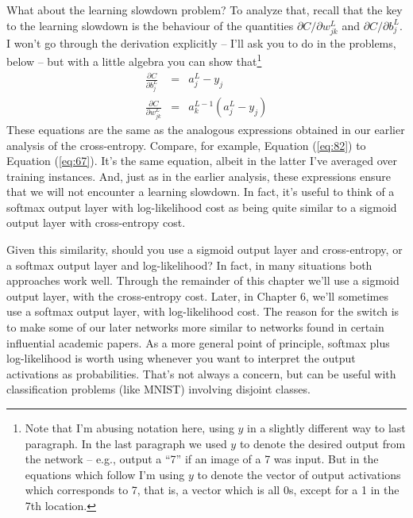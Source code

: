 \documentclass[a4paper,twoside,10pt]{book}
\begin{document}
What about the learning slowdown problem? To analyze that, recall that the key to the learning slowdown is the behaviour of the quantities $\partial C/\partial w^L_{jk}$ and $\partial C/\partial b^L_j$. I won't go through the derivation explicitly -- I'll ask you to do in the problems, below -- but with a little algebra you can show that\footnote{Note that I'm abusing notation here, using $y$ in a slightly different way to last paragraph. In the last paragraph we used $y$ to denote the desired output from the network -- e.g., output a ``7'' if an image of a 7 was input. But in the equations which follow I'm using $y$ to denote the vector of output activations which corresponds to 7, that is, a vector which is all 0s, except for a 1 in the 7th location.}
\begin{eqnarray}
\frac{\partial C}{\partial b^L_j} & = & a^L_j-y_j  \label{eq:81}\\
\frac{\partial C}{\partial w^L_{jk}} & = & a^{L-1}_k (a^L_j-y_j)\label{eq:82}
\end{eqnarray}
These equations are the same as the analogous expressions obtained in our earlier analysis of the cross-entropy. Compare, for example, Equation (\ref{eq:82}) to Equation (\ref{eq:67}). It's the same equation, albeit in the latter I've averaged over training instances. And, just as in the earlier analysis, these expressions ensure that we will not encounter a learning slowdown. In fact, it's useful to think of a softmax output layer with log-likelihood cost as being quite similar to a sigmoid output layer with cross-entropy cost.

Given this similarity, should you use a sigmoid output layer and cross-entropy, or a softmax output layer and log-likelihood? In fact, in many situations both approaches work well. Through the remainder of this chapter we'll use a sigmoid output layer, with the cross-entropy cost. Later, in Chapter 6, we'll sometimes use a softmax output layer, with log-likelihood cost. The reason for the switch is to make some of our later networks more similar to networks found in certain influential academic papers. As a more general point of principle, softmax plus log-likelihood is worth using whenever you want to interpret the output activations as probabilities. That's not always a concern, but can be useful with classification problems (like MNIST) involving disjoint classes.
\end{document}
